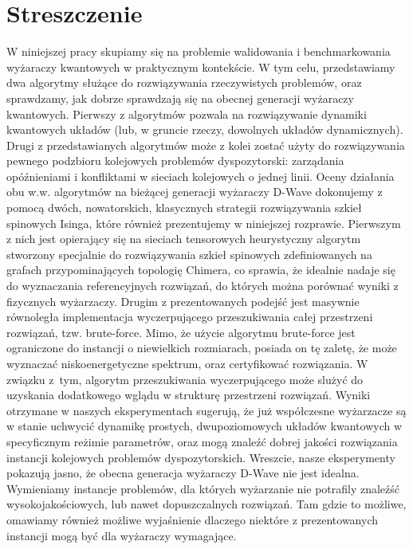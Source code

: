 \chapter{Streszczenie}

\begin{otherlanguage}{polish}
  W niniejszej pracy skupiamy się na problemie walidowania i benchmarkowania
  wyżaraczy kwantowych w praktycznym kontekście. W tym celu, przedstawiamy dwa
  algorytmy służące do rozwiązywania rzeczywistych problemów, oraz sprawdzamy,
  jak dobrze sprawdzają się na obecnej generacji wyżaraczy kwantowych. Pierwszy z
  algorytmów pozwala na rozwiązywanie dynamiki kwantowych układów (lub, w gruncie
  rzeczy, dowolnych układów dynamicznych). Drugi z przedstawianych algorytmów
  może z kolei zostać użyty do rozwiązywania pewnego podzbioru kolejowych
  problemów dyspozytorski: zarządania opóźnieniami i konfliktami w sieciach
  kolejowych o jednej linii. Oceny działania obu w.w. algorytmów na bieżącej
  generacji wyżaraczy D-Wave dokonujemy z pomocą dwóch, nowatorskich, klasycznych
  strategii rozwiązywania szkieł spinowych Isinga, które również prezentujemy w
  niniejszej rozprawie. Pierwszym z nich jest opierający się na sieciach tensorowych
  heurystyczny algorytm stworzony specjalnie do rozwiązywania szkieł spinowych
  zdefiniowanych na grafach przypominających topologię Chimera, co sprawia, że
  idealnie nadaje się do wyznaczania referencyjnych rozwiązań, do których można
  porównać wyniki z fizycznych wyżarzaczy. Drugim z prezentowanych podejść jest
  masywnie równoległa implementacja wyczerpującego przeszukiwania całej
  przestrzeni rozwiązań, tzw. brute-force. Mimo, że użycie algorytmu brute-force
  jest ograniczone do instancji o niewielkich rozmiarach, posiada on tę zaletę,
  że może wyznaczać niskoenergetyczne spektrum, oraz certyfikować rozwiązania. W
  związku z~tym, algorytm przeszukiwania wyczerpującego może slużyć do uzyskania
  dodatkowego wglądu w strukturę przestrzeni rozwiązań. Wyniki otrzymane w
  naszych eksperymentach sugerują, że już współczesne wyżarzacze są w stanie
  uchwycić dynamikę prostych, dwupoziomowych układów kwantowych w specyficznym
  reżimie parametrów, oraz mogą znaleźć dobrej jakości rozwiązania instancji
  kolejowych problemów dyspozytorskich. Wreszcie, nasze eksperymenty pokazują jasno, że obecna
  generacja wyżaraczy D-Wave nie jest idealna. Wymieniamy instancje problemów,
  dla których wyżarzanie nie potrafily znaleźść wysokojakościowych, lub nawet
  dopuszczalnych rozwiązań. Tam gdzie to możliwe, omawiamy również możliwe
  wyjaśnienie dlaczego niektóre z prezentowanych instancji mogą być dla wyżaraczy
  wymagające.
\end{otherlanguage}

